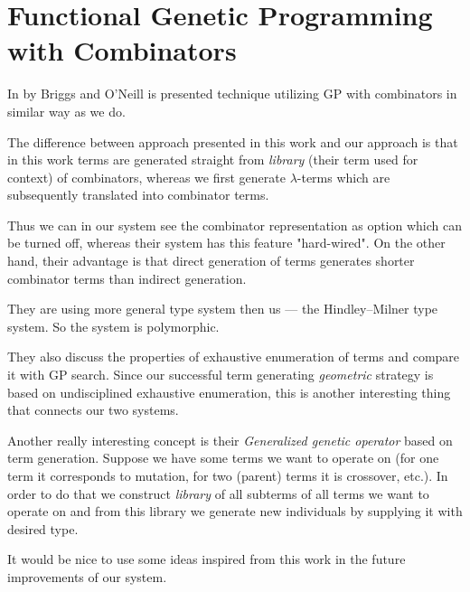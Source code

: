 \documentclass[12pt,a4paper]{report}
\newenvironment{todo}
{ ~\\[0.5em]
  {\color{red}\textbf{TODO}}
  \begin{easylist}[itemize]}
{ \end{easylist}
  ~}
\begin{document}


\section{Functional Genetic Programming with Combinators}
In \cite{kes} by Briggs and O’Neill is presented technique 
utilizing GP with combinators in similar way as we do.

The difference between approach presented in this work
and our approach is that in this work terms are generated
straight from \textit{library} (their term used for context) 
of combinators, whereas we first generate $\lambda$-terms which are
subsequently translated into combinator terms.

Thus we can in our system see the combinator representation
as option which can be turned off, whereas their system has this
feature "hard-wired". On the other hand, their advantage is
that direct generation of terms generates 
shorter combinator terms than indirect generation.   

They are using more general type system then us
--- the Hindley–Milner type system. So the system
is polymorphic.

They also discuss the properties of exhaustive enumeration
of terms and compare it with GP search.  
Since our successful term generating \textit{geometric} strategy
is based on undisciplined exhaustive enumeration, this
is another interesting thing that connects our two systems.   

Another really interesting concept is their \textit{Generalized
genetic operator} based on term generation. Suppose we have
some terms we want to operate on 
(for one term it corresponds to mutation, for two (parent) 
terms it is crossover, etc.). In order to do that we construct 
\textit{library} of all subterms of all terms we want to operate
on and from this library we generate new individuals by supplying
it with desired type.

It would be nice to use some ideas inspired from this work in
the future improvements of our system. 


%
\end{document}
